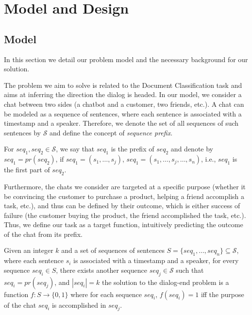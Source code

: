 \section{Model and Design}\label{sec:model}

\subsection{Model}
In this section we detail our problem model and the necessary background 
for our solution.

The problem we aim to solve is related to the Document Classification task 
\cite{DBLP:conf/naacl/YangYDHSH16,Slonim:2002:UDC:564376.564401,DBLP:journals/tkde/IsaLKR08} 
and aims at inferring the direction the dialog is headed. 
In our model, we consider a chat between two sides (a chatbot and a customer, two friends, etc.). 
A chat can be modeled as a sequence of sentences, 
where each sentence is associated with a timestamp and a speaker. 
Therefore, we denote the set of all sequences of 
such sentences by $\mathcal{S}$ and define the concept of {\em sequence prefix}. 

\begin{definition}
For $seq_1, seq_2 \in \mathcal{S}$, we say that $seq_1$ is the 
prefix of $seq_2$ and denote by $seq_1 = pr(seq_2)$, if 
$seq_1 = (s_1, \ldots, s_j)$, $seq_1 = (s_1, \ldots, s_j, \ldots, s_n)$, i.e., $seq_1$ is the 
first part of $seq_2$.
\end{definition}

Furthermore, the chats we consider are targeted at a specific purpose 
(whether it be convincing the customer to purchase a product, helping a friend accomplish a task, etc.), and thus can be defined by their outcome, which 
is either success of failure (the customer buying the product, the friend accomplished the task, etc.). Thus, we define our task as a target function, intuitively predicting the outcome of the chat from its prefix.

\begin{definition}
Given an integer $k$ and a set of sequences of sentences $S=\{seq_1, \ldots, seq_n\} \subseteq \mathcal{S}$,
where each sentence $s_i$ is associated with a timestamp and a speaker, for every sequence $seq_i\in S$, there exists another sequence $seq_j\in \mathcal{S}$ such that $seq_i = pr(seq_j)$, and $|seq_i| = k$ the solution to the dialog-end 
problem is a function $f:S \to \{0,1\}$ where for each sequence $seq_i$, $f(seq_i) = 1$ iff the purpose of the chat $seq_i$ is accomplished in $seq_j$. 
\end{definition}

